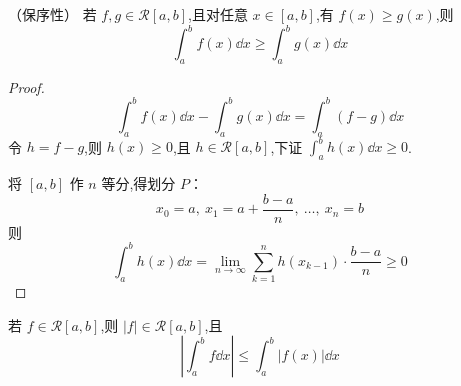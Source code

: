\begin{proposition}（保序性）
	若 \( f,g \in \mathcal{R}[a,b] \),且对任意 \( x \in [a,b] \),有 \( f(x) \geq g(x) \),则
	\[
	\int_a^b f(x)\dd x \geq \int_a^b g(x)\dd x
	\]
	
\end{proposition}
\begin{proof}
	\[
	\int_a^b f(x)\dd x - \int_a^b g(x)\dd x = \int_a^b (f-g)\dd x
	\]
	令 \( h = f-g \),则 \( h(x) \geq 0 \),且 \( h \in \mathcal{R}[a,b] \),下证 \( \int_a^b h(x)\dd x \geq 0 \).
	
	将 \( [a,b] \) 作 \( n \) 等分,得划分 \( P \)：
	\[
	x_0 = a,\ x_1 = a+\frac{b-a}{n},\ \dots,\ x_n = b
	\]
	则
	\[
	\int_a^b h(x)\dd x = \lim_{n \to \infty} \sum_{k=1}^n h(x_{k-1}) \cdot \frac{b-a}{n} \geq 0
	\]
\end{proof}
\begin{proposition}
	若 \( f \in \mathcal{R}[a,b] \),则 \( |f| \in \mathcal{R}[a,b] \),且
	\[
	\left| \int_a^b f \dd x \right| \leq \int_a^b |f(x)| \dd x
	\]
\end{proposition}

